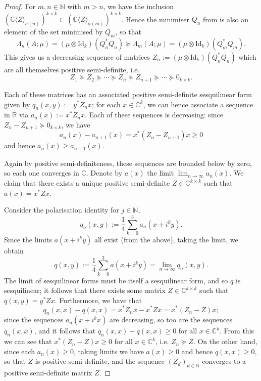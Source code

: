 \documentclass[11pt,reqno]{amsart}
\def\s{\sigma}
\def\L{\Lambda}
\def\NN{\mathbb{N}}
\def\RR{\mathbb{R}}
\def\CC{\mathbb{C}}
\theoremstyle{definition}
\numberwithin{equation}{section}
\begin{document}
\begin{proof}
    For \(m,n \in \NN\) with \(m > n\), we have the inclusion \((\CC\langle Z \rangle_{\s(n)})^{k\times k} \subset (\CC\langle Z \rangle_{\s(m)})^{k\times k}\). Hence the minimiser \(Q_n\) from  is also an element of the set minimised by \(Q_m\), so that
    \[
        \L_{n}(A; \mu) = (\mu \otimes \mathrm{Id}_k)(Q_n^*Q_n) \succeq \L_{m}(A; \mu) = (\mu \otimes \mathrm{Id}_k)(Q_m^*Q_m).
    \]
    This gives us a decreasing sequence of matrices \(Z_n := (\mu \otimes \mathrm{Id}_k)(Q_n^*Q_n)\) which are all themselves positive semi-definite, i.e.
    \[
        Z_1 \succeq Z_2 \succeq \cdots \succeq Z_{n} \succeq Z_{n+1} \succeq \cdots \succeq 0_{k\times k}.
    \]

    Each of these matrices has an associated positive semi-definite sesquilinear form given by \(q_n(x,y) := y^*Z_nx\); for each \(x \in \CC^{k}\), we can hence associate a sequence in \(\RR\) via \(a_n(x) := x^*Z_nx\). Each of these sequences is decreasing: since \(Z_n - Z_{n+1} \succeq 0_{k\times k}\), we have
    \[
        a_n(x) - a_{n+1}(x) = x^*(Z_n - Z_{n+1})x \geq 0
    \]
    and hence \(a_n(x) \geq a_{n+1}(x)\).
    
    Again by positive semi-definiteness, these sequences are bounded below by zero, so each one converges in \(\CC\). Denote by \(a(x)\) the limit \(\lim_{n\to\infty} a_n(x)\). We claim that there exists a unique positive semi-definite \(Z \in \CC^{k\times k}\) such that \(a(x) = x^*Zx\).
    
    Consider the polarisation identity for \(j \in \NN\),
    \[
        q_n(x,y) := \frac{1}{4}\sum_{k=0}^3 a_n(x+i^ky).
    \]
    Since the limits \(a(x+i^k y)\) all exist (from the above), taking the limit, we obtain
    \[
        q(x,y) := \frac{1}{4}\sum_{k=0}^3 a(x+i^ky) = \lim_{n\to\infty} q_n(x,y).
    \]
    The limit of sesquilinear forms must be itself a sesquilinear form, and so \(q\) is sesquilinear; it follows that there exists some matrix \(Z \in \CC^{k\times k}\) such that \(q(x,y) = y^* Z x\). Furthermore, we have that
    \[
        q_n(x,x) - q(x,x) = x^* Z_n x - x^*Zx = x^*(Z_n - Z)x;
    \]
    since the sequences \(a_n(x+i^kx)\) are decreasing, so too are the sequences \(q_n(x,x)\), and it follows that \(q_n(x,x) - q(x,x) \geq 0\) for all \(x \in \CC^k\). From this we can see that \( x^*(Z_n - Z)x \geq 0\) for all \(x \in \CC^k\), i.e. \(Z_n \succeq Z\). On the other hand, since each \(a_n(x) \geq 0\), taking limits we have \(a(x) \geq 0\) and hence \(q(x,x) \geq 0\), so that \(Z\) is positive semi-definite, and the sequence \((Z_d)_{d \in \NN}\) converges to a positive semi-definite matrix \(Z\).
    

\end{proof}
\end{document}
